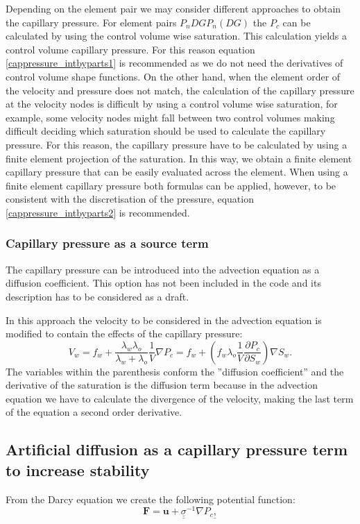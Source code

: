 Depending on the element pair we may consider different approaches to obtain the capillary pressure. For element pairs $P_nDGP_n(DG) $ the $P_c$ can be calculated by using the control volume wise saturation. This calculation yields a control volume capillary pressure. For this reason equation \ref{cappressure_intbyparts1} is recommended as we do not need the derivatives of control volume shape functions. 
On the other hand, when the element order of the velocity and pressure does not match, the calculation of the capillary pressure at the velocity nodes is difficult by using a control volume wise saturation, for example, some velocity nodes might fall between two control volumes making difficult deciding which saturation should be used to calculate the capillary pressure. For this reason, the capillary pressure have to be calculated by using a finite element projection of the saturation. In this way, we obtain a finite element capillary pressure that can be easily evaluated across the element. When using a finite element capillary pressure both formulas can be applied, however, to be consistent with the discretisation of the pressure, equation \ref{cappressure_intbyparts2} is recommended.

\subsubsection*{Capillary pressure as a source term}

The capillary pressure can be introduced into the advection equation as a diffusion coefficient. This option has not been included in the code and its description has to be considered as a draft.

In this approach the velocity to be considered in the advection equation is modified to contain the effects of the capillary pressure:
\begin{equation}
V_w = f_w + \frac{\lambda_w\lambda_o}{\lambda_w+\lambda_o} \frac{1}{V} \nabla P_c = f_w + \left(  f_w \lambda_o \frac{1}{V} \frac{\partial P_c}{\partial S_w} \right) \nabla S_w.
\end{equation}
The variables within the parenthesis conform the ''diffusion coefficient'' and the derivative of the saturation is the diffusion term because in the advection equation we have to calculate the divergence of the velocity, making the last term of the equation a second order derivative.



\subsection{Artificial diffusion as a capillary pressure term to increase stability } 
From the Darcy equation we create the following potential function:
\begin{equation}
\mathbf{F} = \mathbf{u} + \underline {\underline\sigma}^{-1} \nabla P_c \underline ,
\end{equation}

